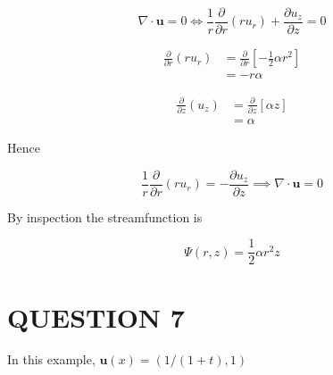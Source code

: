 \documentclass[a4paper]{article}
\begin{document}
\[ \nabla \cdot \mathbf{u} = 0 \iff  \frac{1}{r} \frac{\partial }{\partial r}(ru_{r}) + \frac{\partial u_{z}}{\partial z} = 0  \]


\begin{align*}
\frac{\partial }{\partial r}(ru_{r}) & = \frac{\partial }{\partial r} \left[ - \frac{1}{2} \alpha r^{2} \right]     \\
& = - r \alpha
\end{align*}

\begin{align*}
\frac{\partial }{\partial z}(u_{z}) & = \frac{\partial }{\partial z} \left[ \alpha z \right]    \\
& = \alpha
\end{align*}

Hence 

\[  \frac{1}{r} \frac{\partial }{\partial r}(ru_{r}) = - \frac{\partial u_{z}}{\partial z} \implies \nabla \cdot \mathbf{u} = 0  \]


By inspection the streamfunction is

\[ \Psi(r,z) = \frac{1}{2} \alpha r^{2} z  \]






\section{QUESTION 7}


In this example, $ \mathbf{u}(x) = (  1/(1+t), 1  ) $
\end{document}
